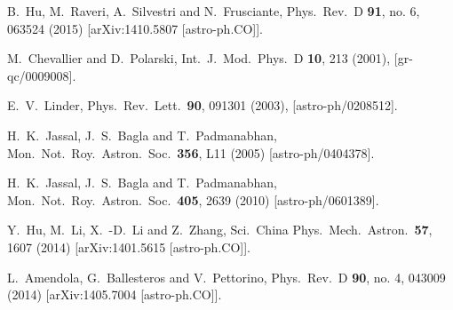 \documentclass[prd,nofootinbib,showpacs]{revtex4}
\begin{document}
{\begin{thebibliography}{999}
  B.~Hu, M.~Raveri, A.~Silvestri and N.~Frusciante,
  Phys.\ Rev.\ D {\bf 91}, no. 6, 063524 (2015)
  [arXiv:1410.5807 [astro-ph.CO]].


	
  M.~Chevallier and D.~Polarski,
  Int.\ J.\ Mod.\ Phys.\ D {\bf 10}, 213 (2001),
 [gr-qc/0009008].
	
  E.~V.~Linder,
  Phys.\ Rev.\ Lett.\  {\bf 90}, 091301 (2003),
  [astro-ph/0208512].

  H.~K.~Jassal, J.~S.~Bagla and T.~Padmanabhan,
  Mon.\ Not.\ Roy.\ Astron.\ Soc.\  {\bf 356}, L11 (2005)
  [astro-ph/0404378].
  
  H.~K.~Jassal, J.~S.~Bagla and T.~Padmanabhan,
  Mon.\ Not.\ Roy.\ Astron.\ Soc.\  {\bf 405}, 2639 (2010)
  [astro-ph/0601389].

  Y.~Hu, M.~Li, X.~-D.~Li and Z.~Zhang,
  Sci.\ China Phys.\ Mech.\ Astron.\  {\bf 57}, 1607 (2014)
  [arXiv:1401.5615 [astro-ph.CO]].
	
	

  
  L.~Amendola, G.~Ballesteros and V.~Pettorino,
  Phys.\ Rev.\ D {\bf 90}, no. 4, 043009 (2014)
  [arXiv:1405.7004 [astro-ph.CO]].



\end{thebibliography}}
\end{document}
